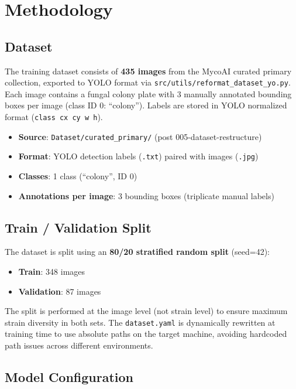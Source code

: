 \documentclass[11pt,a4paper]{article}
\begin{document}
\section{Methodology}

\subsection{Dataset}

The training dataset consists of \textbf{435 images} from the MycoAI curated primary collection, exported to YOLO format via \texttt{src/utils/reformat\_dataset\_yo.py}. Each image contains a fungal colony plate with 3 manually annotated bounding boxes per image (class ID 0: ``colony''). Labels are stored in YOLO normalized format (\texttt{class cx cy w h}).

\begin{itemize}[nosep]
  \item \textbf{Source}: \texttt{Dataset/curated\_primary/} (post 005-dataset-restructure)
  \item \textbf{Format}: YOLO detection labels (\texttt{.txt}) paired with images (\texttt{.jpg})
  \item \textbf{Classes}: 1 class (``colony'', ID 0)
  \item \textbf{Annotations per image}: 3 bounding boxes (triplicate manual labels)
\end{itemize}

\subsection{Train / Validation Split}

The dataset is split using an \textbf{80/20 stratified random split} (seed=42):
\begin{itemize}[nosep]
  \item \textbf{Train}: 348 images
  \item \textbf{Validation}: 87 images
\end{itemize}

The split is performed at the image level (not strain level) to ensure maximum strain diversity in both sets. The \texttt{dataset.yaml} is dynamically rewritten at training time to use absolute paths on the target machine, avoiding hardcoded path issues across different environments.

\subsection{Model Configuration}
\end{document}

